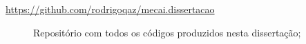 \begin{description}
 \item[\url{https://github.com/rodrigoqaz/mecai.dissertacao}] Repositório com todos os códigos produzidos nesta dissertação;
 \end{description}